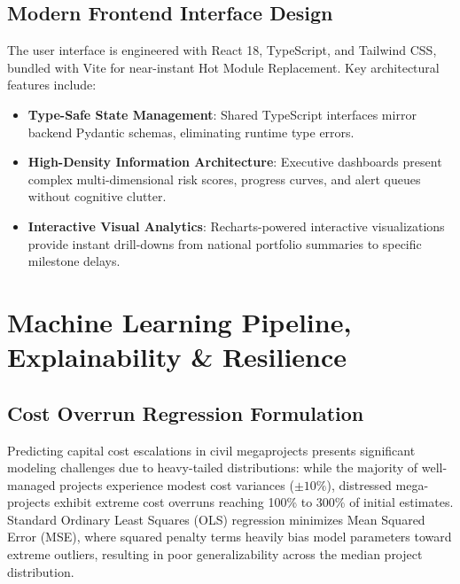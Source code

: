 \documentclass[conference]{IEEEtran}
\begin{document}
\subsection{Modern Frontend Interface Design}
The user interface is engineered with React 18, TypeScript, and Tailwind CSS, bundled with Vite for near-instant Hot Module Replacement. Key architectural features include:
\begin{itemize}
    \item \textbf{Type-Safe State Management}: Shared TypeScript interfaces mirror backend Pydantic schemas, eliminating runtime type errors.
    \item \textbf{High-Density Information Architecture}: Executive dashboards present complex multi-dimensional risk scores, progress curves, and alert queues without cognitive clutter.
    \item \textbf{Interactive Visual Analytics}: Recharts-powered interactive visualizations provide instant drill-downs from national portfolio summaries to specific milestone delays.
\end{itemize}

\section{Machine Learning Pipeline, Explainability \& Resilience}

\subsection{Cost Overrun Regression Formulation}
Predicting capital cost escalations in civil megaprojects presents significant modeling challenges due to heavy-tailed distributions: while the majority of well-managed projects experience modest cost variances ($\pm 10\%$), distressed mega-projects exhibit extreme cost overruns reaching 100\% to 300\% of initial estimates. Standard Ordinary Least Squares (OLS) regression minimizes Mean Squared Error (MSE), where squared penalty terms heavily bias model parameters toward extreme outliers, resulting in poor generalizability across the median project distribution.
\end{document}
